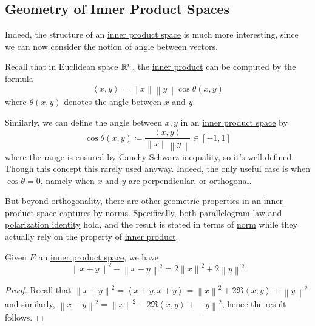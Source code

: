 \subsection{Geometry of Inner Product Spaces}
Indeed, the structure of an \hyperref[def:inner-product-space]{inner product space} is much more interesting, since we can now consider the notion of angle between vectors.
\begin{prev}
	Recall that in Euclidean space \(\mathbb{\MakeUppercase{r}} ^n\), the \hyperref[def:inner-product]{inner product} can be computed by the formula
	\[
		\left\langle x, y \right\rangle = \left\lVert x\right\rVert \left\lVert y\right\rVert \cos \theta (x, y)
	\]
	where \(\theta (x, y)\) denotes the angle between \(x\) and \(y\).
\end{prev}

Similarly, we can define the angle between \(x, y\) in an \hyperref[def:inner-product-space]{inner product space} by
\[
	\cos \theta (x, y) \coloneqq \frac{\left\langle x, y \right\rangle }{\left\lVert x\right\rVert \left\lVert y\right\rVert } \in [-1, 1]
\]
where the range is ensured by \hyperref[thm:Cauchy-Schwarz-ineq]{Cauchy-Schwarz inequality}, so it's well-defined. Though this concept this rarely used anyway. Indeed, the only useful case is when \(\cos \theta = 0\), namely when \(x\) and \(y\) are perpendicular, or \hyperref[def:orthogonal]{orthogonal}.

But beyond \hyperref[def:orthogonal]{orthogonality}, there are other geometric properties in an \hyperref[def:inner-product-space]{inner product space} captures by \hyperref[def:norm]{norms}. Specifically, both \hyperref[lma:parallelogram-law]{parallelogram law} and \hyperref[lma:polarization-identity]{polarization identity} hold, and the result is stated in terms of \hyperref[def:norm]{norm} while they actually rely on the property of \hyperref[def:inner-product]{inner product}.

\begin{lemma}\label{lma:parallelogram-law}
	Given \(E\) an \hyperref[def:inner-product-space]{inner product space}, we have
	\[
		\left\lVert x+y\right\rVert ^{2} + \left\lVert x-y\right\rVert ^{2} = 2\left\lVert x\right\rVert ^{2} + 2\left\lVert y\right\rVert ^{2}
	\]
\end{lemma}
\begin{proof}
	Recall that \(\left\lVert x + y\right\rVert ^{2} = \left\langle x + y, x + y \right\rangle = \left\lVert x\right\rVert ^{2} + 2 \Re \left\langle x, y \right\rangle + \left\lVert y\right\rVert ^{2} \) and similarly, \(\left\lVert x - y\right\rVert ^{2} = \left\lVert x\right\rVert ^{2} - 2\Re \left\langle x, y \right\rangle + \left\lVert y\right\rVert ^{2}\), hence the result follows.
\end{proof}

